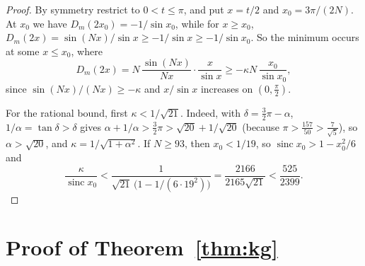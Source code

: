 \documentclass[11pt]{amsart}
\theoremstyle{tplain}
\theoremstyle{tdefinition}
\theoremstyle{tremark}
\begin{document}
\begin{proof}
By symmetry restrict to $0<t\le\pi$, and put $x=t/2$ and $x_0=3\pi/(2N)$. At
$x_0$ we have $D_m(2x_0)=-1/\sin x_0$, while for $x\ge x_0$,
$D_m(2x)=\sin(Nx)/\sin x\ge-1/\sin x\ge-1/\sin x_0$. So the minimum occurs
at some $x\le x_0$, where
\[
 D_m(2x)=N\,\frac{\sin(Nx)}{Nx}\cdot\frac{x}{\sin x}
 \ge-\kappa N\,\frac{x_0}{\sin x_0},
\]
since $\sin(Nx)/(Nx)\ge-\kappa$ and $x/\sin x$ increases on $(0,\frac\pi2)$.

For the rational bound, first $\kappa<1/\sqrt{21}$. Indeed, with
$\delta=\frac32\pi-\alpha$, $1/\alpha=\tan\delta>\delta$ gives
$\alpha+1/\alpha>\frac32\pi>\sqrt{20}+1/\sqrt{20}$ (because
$\pi>\frac{157}{50}>\frac7{\sqrt5}$), so $\alpha>\sqrt{20}$, and
$\kappa=1/\sqrt{1+\alpha^2}$. If $N\ge93$, then $x_0<1/19$, so
$\operatorname{sinc}x_0>1-x_0^2/6$ and
\[
 \frac{\kappa}{\operatorname{sinc}x_0}
 <\frac1{\sqrt{21}\,\bigl(1-1/(6\cdot19^2)\bigr)}
 =\frac{2166}{2165\sqrt{21}}<\frac{525}{2399}.
\]
\end{proof}

\section{Proof of Theorem~\ref{thm:kg}}\label{app:kg}
\end{document}
